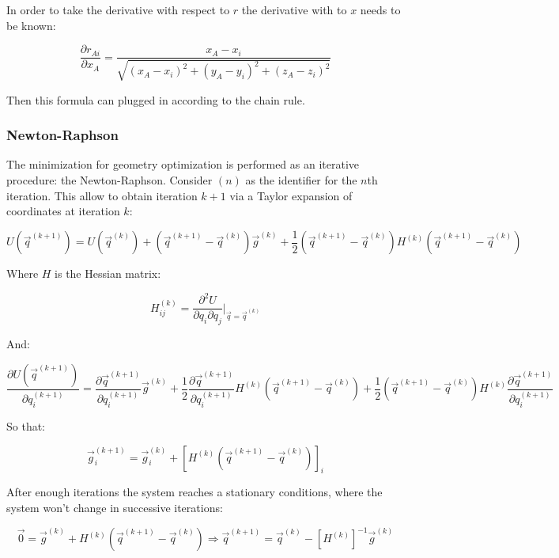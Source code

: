 		In order to take the derivative with respect to $r$ the derivative with to $x$ needs to be known:

		$$\frac{\partial r_{Ai}}{\partial x_A} = \frac{x_A-x_i}{\sqrt{(x_A-x_i)^2+(y_A-y_i)^2+(z_A-z_i)^2}}$$

		Then this formula can plugged in according to the chain rule.

		\subsubsection{Newton-Raphson}
		The minimization for geometry optimization is performed as an iterative procedure: the Newton-Raphson.
		Consider $(n)$ as the identifier for the $n$th iteration.
		This allow to obtain iteration $k+1$ via a Taylor expansion of coordinates at iteration $k$:

		$$U(\vec{q}^{(k+1)}) = U(\vec{q}^{(k)}) + (\vec{q}^{(k+1)} -\vec{q}^{(k)})\vec{g}^{(k)} + \frac{1}{2}(\vec{q}^{(k+1)}-\vec{q}^{(k)})H^{(k)}(\vec{q}^{(k+1)}-\vec{q}^{(k)})$$

		Where $H$ is the Hessian matrix:

		$$H_{ij}^{(k)} = \frac{\partial^2 U}{\partial q_i\partial q_j}\biggr\vert_{\vec{q}=\vec{q}^{(k)}}$$

		And:

		$$\frac{\partial U(\vec{q}^{(k+1)})}{\partial q_i^{(k+1)}} = \frac{\partial \vec{q}^{(k+1)}}{\partial q_i^{(k+1)}}\vec{g}^{(k)}+ \frac{1}{2}\frac{\partial \vec{q}^{(k+1)}}{\partial q_i^{(k+1)}}H^{(k)}(\vec{q}^{(k+1)}-\vec{q}^{(k)})+\frac{1}{2}(\vec{q}^{(k+1)}-\vec{q}^{(k)})H^{(k)}\frac{\partial \vec{q}^{(k+1)}}{\partial q_i^{(k+1)}}$$

		So that:

		$$\vec{g}_i^{(k+1)} = \vec{g}_i^{(k)} + [H^{(k)}(\vec{q}^{(k+1)}-\vec{q}^{(k)})]_i$$

		After enough iterations the system reaches a stationary conditions, where the system won't change in successive iterations:

		$$\vec{0} = \vec{g}^{(k)} + H^{(k)}(\vec{q}^{(k+1)}-\vec{q}^{(k)})\Rightarrow \vec{q}^{(k+1)} = \vec{q}^{(k)} - [H^{(k)}]^{-1}\vec{g}^{(k)}$$
